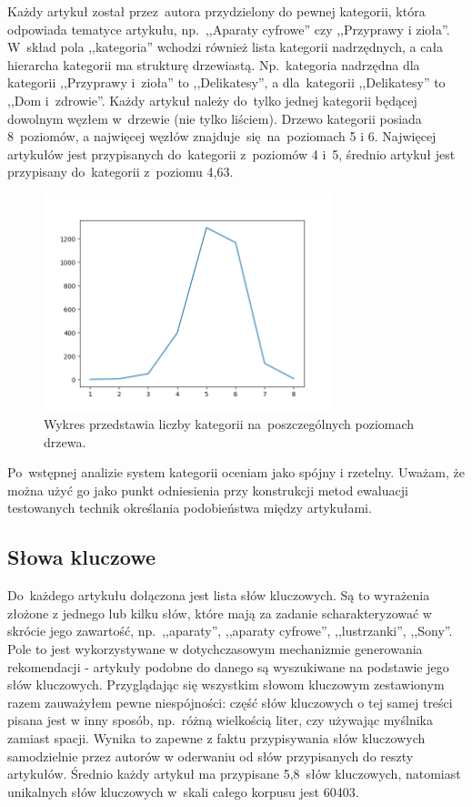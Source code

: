 \documentclass[pl]{minipw} %
\begin{document}
Każdy artykuł został przez~autora przydzielony do pewnej kategorii, która odpowiada tematyce artykułu, np.~,,Aparaty cyfrowe'' czy ,,Przyprawy i zioła''. W~skład pola ,,kategoria'' wchodzi również lista kategorii nadrzędnych, a cała hierarcha kategorii ma strukturę drzewiastą. Np.~kategoria nadrzędna dla kategorii ,,Przyprawy i~zioła'' to ,,Delikatesy'', a dla~kategorii ,,Delikatesy'' to ,,Dom i~zdrowie''. Każdy artykuł należy do~tylko jednej kategorii będącej dowolnym węzłem w~drzewie (nie tylko liściem). Drzewo kategorii posiada 8~poziomów, a najwięcej węzłów znajduje~się na~poziomach 5 i 6. Najwięcej artykułów jest przypisanych do~kategorii z~poziomów 4 i~5, średnio artykuł jest przypisany do~kategorii z~poziomu 4,63.
\begin{figure}[H]
	\centering
	\includegraphics[width=0.75\textwidth]{img/categories_levels.png}
	\caption{Wykres przedstawia liczby kategorii na~poszczególnych poziomach drzewa.}
\end{figure}
Po~wstępnej analizie system kategorii oceniam jako spójny i rzetelny. Uważam, że można użyć go jako punkt odniesienia przy konstrukcji metod ewaluacji testowanych technik określania podobieństwa między artykułami.
\subsection{Słowa kluczowe}
Do~każdego artykułu dołączona jest lista słów kluczowych. Są to wyrażenia złożone z jednego lub kilku słów, które mają za zadanie scharakteryzować w skrócie jego zawartość, np.~,,aparaty'', ,,aparaty cyfrowe'', ,,lustrzanki'', ,,Sony''. Pole to jest wykorzystywane w dotychczasowym mechanizmie generowania rekomendacji - artykuły podobne do danego są wyszukiwane na podstawie jego słów kluczowych. Przyglądając się wszystkim słowom kluczowym zestawionym razem zauważyłem pewne niespójności: część słów kluczowych o tej samej treści pisana jest w inny sposób, np.~różną wielkością liter, czy używając myślnika zamiast spacji. Wynika to zapewne z faktu przypisywania słów kluczowych samodzielnie przez autorów w oderwaniu od słów przypisanych do reszty artykułów. Średnio każdy artykuł ma przypisane 5,8~słów kluczowych, natomiast unikalnych słów kluczowych w~skali całego korpusu jest 60403.
\end{document}

